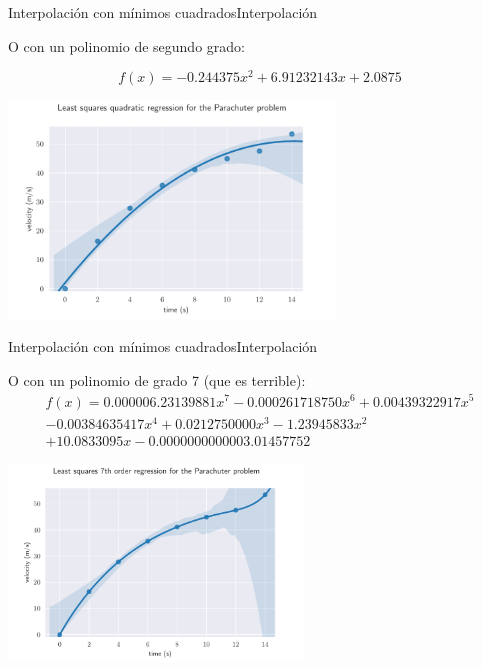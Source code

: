 \documentclass[spanish, c, dvipsnames]{beamer}
\begin{document}
\begin{frame}{Interpolación con mínimos cuadrados}{Interpolación}

    O con un polinomio de segundo grado:

    $$f(x) = -0.244375 x^2 + 6.91232143 x + 2.0875$$

    \begin{center}
        \includegraphics[width=0.65\textwidth]{inter03.pdf}
    \end{center}

\end{frame}

\begin{frame}{Interpolación con mínimos cuadrados}{Interpolación}

    O con un polinomio de grado 7 (que es terrible):
    \begin{equation*}
        \begin{split}
            f(x) = 0.000006.23139881 x^7 -0.000261718750 x^6 + 0.00439322917 x^5 \\
            -0.00384635417 x^4 + 0.0212750000 x^3 -1.23945833 x^2 \\
            + 10.0833095 x -0.0000000000003.01457752
        \end{split}
    \end{equation*}

    \begin{center}
        \includegraphics[width=0.59\textwidth]{inter04.pdf}
    \end{center}

\end{frame}
\end{document}
